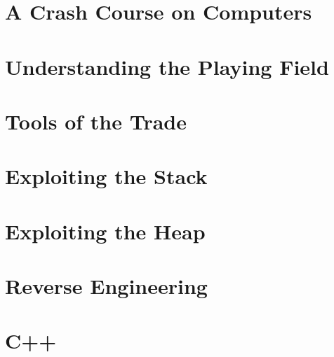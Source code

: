 \documentclass{article}
\author{Devin Neal}
\begin{document}
\tableofcontents
\newpage

\section{A Crash Course on Computers}


\section{Understanding the Playing Field}


\section{Tools of the Trade}


\section{Exploiting the Stack}


\section{Exploiting the Heap}

\section{Reverse Engineering}

\section{C++}
\end{document}
